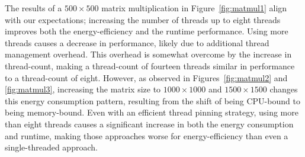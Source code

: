 The results of a $500 \times 500$ matrix multiplication in Figure~\ref{fig:matmul1} align with our
expectations; increasing the number of threads up to eight threads improves both the
energy-efficiency and the runtime performance. Using more threads causes a decrease in performance,
likely due to additional thread management overhead. This overhead is somewhat overcome by the
increase in thread-count, making a thread-count of fourteen threads similar in performance to a
thread-count of eight. However, as observed in Figures~\ref{fig:matmul2} and \ref{fig:matmul3},
increasing the matrix size to $1000 \times 1000$ and $1500 \times 1500$ changes this energy
consumption pattern, resulting from the shift of being CPU-bound to being memory-bound. Even with an
efficient thread pinning strategy, using more than eight threads causes a significant increase in
both the energy consumption and runtime, making those approaches worse for energy-efficiency than
even a single-threaded approach.

